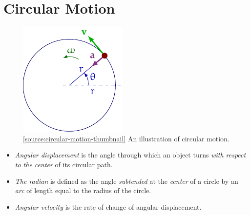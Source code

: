 \documentclass[oneside]{book}
\begin{document}
\chapter{Circular Motion}
\begin{figure}[H]
    \centering
    \includegraphics[page=5]{../images/Circular-motion-image/Circular-motion-image.pdf}
    \caption{\ref{source:circular-motion-thumbnail} An illustration of circular motion.}
    \label{fig:circular-motion-thumbnail}
\end{figure}
\begin{itemize}
    \item \emph{Angular displacement} is the angle through which an object turns \emph{with respect to the center} of its circular path.
    \item \emph{The radian} is defined as the angle \emph{subtended} at the \emph{center} of a circle by an \emph{arc} of length equal to the radius of the circle. 
    \item \emph{Angular velocity} is the rate of change of angular displacement.
\end{itemize}
\end{document}
